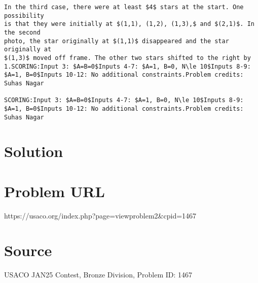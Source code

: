 \documentclass[12pt]{article}
\begin{document}
\begin{verbatim}
In the third case, there were at least $4$ stars at the start. One possibility
is that they were initially at $(1,1), (1,2), (1,3),$ and $(2,1)$. In the second
photo, the star originally at $(1,1)$ disappeared and the star originally at
$(1,3)$ moved off frame. The other two stars shifted to the right by 1.SCORING:Input 3: $A=B=0$Inputs 4-7: $A=1, B=0, N\le 10$Inputs 8-9: $A=1, B=0$Inputs 10-12: No additional constraints.Problem credits: Suhas Nagar

SCORING:Input 3: $A=B=0$Inputs 4-7: $A=1, B=0, N\le 10$Inputs 8-9: $A=1, B=0$Inputs 10-12: No additional constraints.Problem credits: Suhas Nagar
\end{verbatim}

\section*{Solution}


\section*{Problem URL}
https://usaco.org/index.php?page=viewproblem2&cpid=1467

\section*{Source}
USACO JAN25 Contest, Bronze Division, Problem ID: 1467
\end{document}
